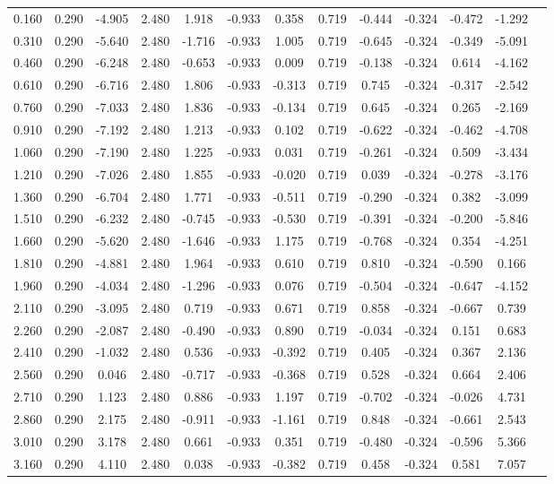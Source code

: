 {\begin{table}[H]
{\begin{tabular}{|c|cccccccccc|c|c|}
0.160 & 0.290 & -4.905 & 2.480 & 1.918 & -0.933 & 0.358 & 0.719 & -0.444 & -0.324 & -0.472 & -1.292 \\
0.310 & 0.290 & -5.640 & 2.480 & -1.716 & -0.933 & 1.005 & 0.719 & -0.645 & -0.324 & -0.349 & -5.091 \\
0.460 & 0.290 & -6.248 & 2.480 & -0.653 & -0.933 & 0.009 & 0.719 & -0.138 & -0.324 & 0.614 & -4.162 \\
0.610 & 0.290 & -6.716 & 2.480 & 1.806 & -0.933 & -0.313 & 0.719 & 0.745 & -0.324 & -0.317 & -2.542 \\
0.760 & 0.290 & -7.033 & 2.480 & 1.836 & -0.933 & -0.134 & 0.719 & 0.645 & -0.324 & 0.265 & -2.169 \\
0.910 & 0.290 & -7.192 & 2.480 & 1.213 & -0.933 & 0.102 & 0.719 & -0.622 & -0.324 & -0.462 & -4.708 \\
1.060 & 0.290 & -7.190 & 2.480 & 1.225 & -0.933 & 0.031 & 0.719 & -0.261 & -0.324 & 0.509 & -3.434 \\
1.210 & 0.290 & -7.026 & 2.480 & 1.855 & -0.933 & -0.020 & 0.719 & 0.039 & -0.324 & -0.278 & -3.176 \\
1.360 & 0.290 & -6.704 & 2.480 & 1.771 & -0.933 & -0.511 & 0.719 & -0.290 & -0.324 & 0.382 & -3.099 \\
1.510 & 0.290 & -6.232 & 2.480 & -0.745 & -0.933 & -0.530 & 0.719 & -0.391 & -0.324 & -0.200 & -5.846 \\
1.660 & 0.290 & -5.620 & 2.480 & -1.646 & -0.933 & 1.175 & 0.719 & -0.768 & -0.324 & 0.354 & -4.251 \\
1.810 & 0.290 & -4.881 & 2.480 & 1.964 & -0.933 & 0.610 & 0.719 & 0.810 & -0.324 & -0.590 & 0.166 \\
1.960 & 0.290 & -4.034 & 2.480 & -1.296 & -0.933 & 0.076 & 0.719 & -0.504 & -0.324 & -0.647 & -4.152 \\
2.110 & 0.290 & -3.095 & 2.480 & 0.719 & -0.933 & 0.671 & 0.719 & 0.858 & -0.324 & -0.667 & 0.739 \\
2.260 & 0.290 & -2.087 & 2.480 & -0.490 & -0.933 & 0.890 & 0.719 & -0.034 & -0.324 & 0.151 & 0.683 \\
2.410 & 0.290 & -1.032 & 2.480 & 0.536 & -0.933 & -0.392 & 0.719 & 0.405 & -0.324 & 0.367 & 2.136 \\
2.560 & 0.290 & 0.046 & 2.480 & -0.717 & -0.933 & -0.368 & 0.719 & 0.528 & -0.324 & 0.664 & 2.406 \\
2.710 & 0.290 & 1.123 & 2.480 & 0.886 & -0.933 & 1.197 & 0.719 & -0.702 & -0.324 & -0.026 & 4.731 \\
2.860 & 0.290 & 2.175 & 2.480 & -0.911 & -0.933 & -1.161 & 0.719 & 0.848 & -0.324 & -0.661 & 2.543 \\
3.010 & 0.290 & 3.178 & 2.480 & 0.661 & -0.933 & 0.351 & 0.719 & -0.480 & -0.324 & -0.596 & 5.366 \\
3.160 & 0.290 & 4.110 & 2.480 & 0.038 & -0.933 & -0.382 & 0.719 & 0.458 & -0.324 & 0.581 & 7.057 \\
\hline
\end{tabular}
}
\end{table}

}
